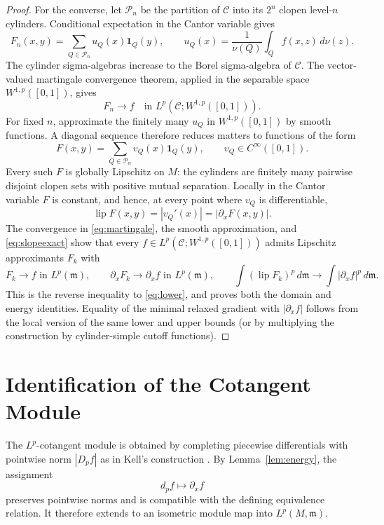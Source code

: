\documentclass[11pt]{article}
\newcommand{\Ccal}{\mathcal C}
\newcommand{\lipc}{\operatorname{lip}}
\newcommand{\m}{\mathfrak m}
\begin{document}
\begin{proof}
For the converse, let $\mathcal P_n$ be the partition of $\Ccal$ into its
$2^n$ clopen level-$n$ cylinders.  Conditional expectation in the Cantor
variable gives
\[
 F_n(x,y)=\sum_{Q\in\mathcal P_n}u_Q(x)\mathbf1_Q(y),
 \qquad
 u_Q(x)=\frac1{\nu(Q)}\int_Q f(x,z)\,d\nu(z).
\]
The cylinder sigma-algebras increase to the Borel sigma-algebra of
$\Ccal$.  The vector-valued martingale convergence theorem, applied in the
separable space $W^{1,p}([0,1])$, gives
\begin{equation}\label{eq:martingale}
 F_n\longrightarrow f
 \quad\text{in }L^p(\Ccal;W^{1,p}([0,1])).
\end{equation}
For fixed $n$, approximate the finitely many $u_Q$ in $W^{1,p}([0,1])$ by
smooth functions.  A diagonal sequence therefore reduces matters to
functions of the form
\begin{equation}\label{eq:cylindersimple}
       F(x,y)=\sum_{Q\in\mathcal P_n}v_Q(x)\mathbf1_Q(y),
       \qquad v_Q\in C^\infty([0,1]).
\end{equation}
Every such $F$ is globally Lipschitz on $M$: the cylinders are finitely many
pairwise disjoint clopen sets with positive mutual separation.  Locally in
the Cantor variable $F$ is constant, and hence, at every point where $v_Q$
is differentiable,
\begin{equation}\label{eq:slopeexact}
                       \lipc F(x,y)=|v_Q'(x)|=|\partial_xF(x,y)|.
\end{equation}
The convergence in \eqref{eq:martingale}, the smooth approximation, and
\eqref{eq:slopeexact} show that every
$f\in L^p(\Ccal;W^{1,p}([0,1]))$ admits Lipschitz approximants $F_k$ with
\[
 F_k\to f\text{ in }L^p(\m),\qquad
 \partial_xF_k\to\partial_xf\text{ in }L^p(\m),\qquad
 \int(\lipc F_k)^p\,d\m\to\int|\partial_xf|^p\,d\m.
\]
This is the reverse inequality to \eqref{eq:lower}, and proves both the
domain and energy identities.  Equality of the minimal relaxed gradient
with $|\partial_xf|$ follows from the local version of the same lower and
upper bounds (or by multiplying the construction by cylinder-simple cutoff
functions).
\end{proof}

\section*{Identification of the Cotangent Module}

The $L^p$-cotangent module is obtained by completing piecewise differentials
with pointwise norm $|D_pf|$ as in Kell's construction \cite{Kell}.  By
Lemma~\ref{lem:energy}, the assignment
\begin{equation}\label{eq:modulemap}
                         d_pf\longmapsto\partial_xf
\end{equation}
preserves pointwise norms and is compatible with the defining equivalence
relation.  It therefore extends to an isometric module map into
$L^p(M,\m)$.
\end{document}
